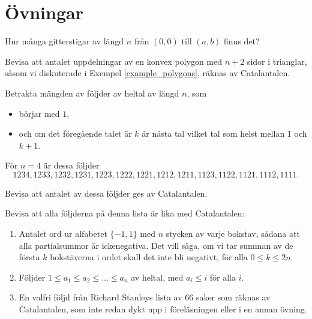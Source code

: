 \documentclass[nobib]{tufte-handout}
\begin{document}
\section{Övningar}

\begin{xca}
    Hur många gitterstigar av längd $n$ från $(0,0)$ till $(a,b)$ finns det?
\end{xca}

\begin{xca}
    Bevisa att antalet uppdelningar av en konvex polygon med $n+2$ sidor i trianglar, såsom vi diskuterade i Exempel \ref{example_polygons}, räknas av Catalantalen.
\end{xca}

\begin{xca}
    Betrakta mängden av följder av heltal av längd $n$, som
    \begin{itemize}
        \item börjar med $1$,
        \item och om det föregående talet är $k$ är nästa tal vilket tal som helst mellan $1$ och $k+1$.
    \end{itemize} 

    För $n = 4$ är dessa följder
    $$1234, 1233, 1232, 1231, 1223, 1222, 1221, 1212, 1211, 1123, 1122, 1121, 1112, 1111.$$

    Bevisa att antalet av dessa följder ges av Catalantalen.
\end{xca}

\begin{xca}
    Bevisa att alla följderna på denna lista är lika med Catalantalen:
    \begin{enumerate}
        \item Antalet ord ur alfabetet $\{-1, 1\}$ med $n$ stycken av varje bokstav, sådana att alla partialsummor är ickenegativa. Det vill säga, om vi tar summan av de första $k$ bokstäverna i ordet skall det inte bli negativt, för alla $0 \leq k \leq 2n$.
        \item Följder $1 \leq a_1 \leq a_2 \leq \ldots \leq a_n$ av heltal, med $a_i \leq i$ för alla $i$.
        \item En valfri följd från Richard Stanleys lista av 66 saker som räknas av Catalantalen, som inte redan dykt upp i föreläsningen eller i en annan övning.
    \end{enumerate}
\end{xca}
\end{document}
